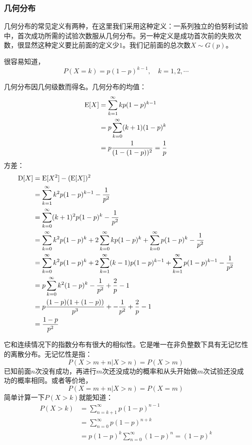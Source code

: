 \subsubsection{几何分布}

几何分布的常见定义有两种，在这里我们采用这种定义：一系列独立的伯努利试验中，首次成功所需的试验次数服从几何分布。另一种定义是成功首次前的失败次数，很显然这种定义要比前面的定义少$1$。我们记前面的总次数$X\sim G(p)$。

很容易知道，
\[
P(X=k)=p(1-p)^{k-1},\quad k=1,2,\cdots
\]

几何分布因几何级数而得名。几何分布的均值：
\begin{align*}
\operatorname{E}[X]&=\sum_{k=1}^{\infty}kp(1-p)^{k-1}\\
&=p\sum_{k=0}^{\infty}(k+1)(1-p)^{k}\\
&=p\frac{1}{(1-(1-p))^2}=\frac1p\\
\end{align*}
方差：
\begin{align*}
\operatorname{D}[X]&=\operatorname{E}[X^2]-(\operatorname{E}[X])^2\\
&= \sum_{k=1}^{\infty}k^2p(1-p)^{k-1} - \frac1{p^2}\\
&= \sum_{k=0}^{\infty}(k+1)^2p(1-p)^{k} - \frac1{p^2}\\
&= \sum_{k=0}^{\infty}k^2p(1-p)^{k} + 2\sum_{k=0}^{\infty}kp(1-p)^{k} +\sum_{k=0}^{\infty}p(1-p)^{k} - \frac1{p^2}\\
&= \sum_{k=0}^{\infty}k^2p(1-p)^{k} + 2\sum_{k=1}^{\infty}(k-1)p(1-p)^{k-1} +\sum_{k=1}^{\infty}p(1-p)^{k-1} - \frac1{p^2}\\
&= p\sum_{k=0}^{\infty}k^2(1-p)^{k} -\frac1{p^2}+ \frac2p -1\\
&= p\frac{(1-p)(1+(1-p))}{p^3} + -\frac1{p^2}+ \frac2p -1\\
&= \frac{1-p}{p^2}
\end{align*}

它和连续情况下的指数分布有很大的相似性。它是唯一在非负整数下具有无记忆性的离散分布。无记忆性是指：
\[
P(X>m+n|X>n) = P(X>m)
\]
已知前面$n$次没有成功，再进行$m$次还没成功的概率和从头开始做$m$次试验还没成功的概率相同。或者等价地，
\[
P(X=m+n|X>n) = P(X=m)
\]
简单计算一下$P(X>k)$就能知道：
\begin{align*}
P(X>k)&=\sum_{n=k+1}^{\infty}p(1-p)^{n-1}\\
&=\sum_{n=0}^{\infty}p(1-p)^{n+k}\\
&=p(1-p)^k\sum_{n=0}^{\infty}(1-p)^{n}=(1-p)^k\\
\end{align*}

